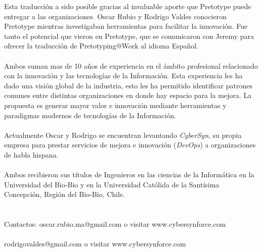 \documentclass{article}
\begin{document}
Esta traducci\'on a sido posible gracias al invaluable aporte que Pretotype puede entregar a las organizaciones. Oscar Rubio y Rodrigo Valdes conocieron Pretotype mientras investigaban herramientas para facilitar la innovaci\'on. Fue tanto el potencial que vieron en Pretotype, que se comunicaron con Jeremy para ofrecer la traducci\'on de Pretotyping@Work al idioma Espa\~nol.
\\ \\
Ambos suman mas de 10 a\~nos de experiencia en el \'ambito profesional relacionado con la innovaci\'on y las tecnolog\'ias de la Informaci\'on. Esta experiencia les ha dado una visi\'on global de la industria, esto les ha permitido identificar patrones comunes entre distintas organizaciones en donde hay espacio para la mejora. La propuesta es generar mayor valor e innovaci\'on mediante herramientas y paradigmas modernos de tecnolog\'ias de la Informaci\'on.
\\ \\
Actualmente Oscar y Rodrigo se encuentran levantando \textit{CyberSyn}, su propia empresa para prestar servicios de mejora e innovaci\'on (\textit{DevOps}) a organizaciones de habla hispana.
\\ \\
Ambos recibieron sus t\'itulos de Ingenieros en las ciencias de la Inform\'atica en la Universidad del Bio-Bio y en la Universidad Cat\'olida de la Sant\'isima Concepci\'on, Regi\'on del Bio-Bio, Chile.
\\ \\ \\
Contactos:
oscar.rubio.ma@gmail.com o visitar www.cybersynforce.com
\\ \\
rodrigovaldes@gmail.com o visitar www.cybersynforce.com
\end{document}
